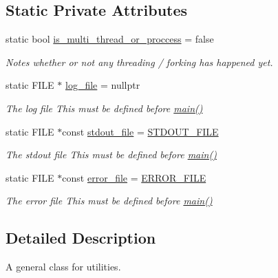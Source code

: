 \subsection*{Static Private Attributes}
\begin{DoxyCompactItemize}
\item 
static bool \hyperlink{class_utilities_af893d8dcd5bb1ba3fc72fc108536bcbc}{is\+\_\+multi\+\_\+thread\+\_\+or\+\_\+proccess} = false
\begin{DoxyCompactList}\small\item\em Notes whether or not any threading / forking has happened yet. \end{DoxyCompactList}\item 
static F\+I\+LE $\ast$ \hyperlink{class_utilities_a63ce9d08b6459cd102bb368a274aca07}{log\+\_\+file} = nullptr
\begin{DoxyCompactList}\small\item\em The log file This must be defined before \hyperlink{shadow__stack_8cpp_a0ddf1224851353fc92bfbff6f499fa97}{main()} \end{DoxyCompactList}\item 
static F\+I\+LE $\ast$const \hyperlink{class_utilities_a224eea0a234ac9877a8334f74fc89ef0}{stdout\+\_\+file} = \hyperlink{constants_8hpp_a195ca3987a60992c5abfc663cd37151d}{S\+T\+D\+O\+U\+T\+\_\+\+F\+I\+LE}
\begin{DoxyCompactList}\small\item\em The stdout file This must be defined before \hyperlink{shadow__stack_8cpp_a0ddf1224851353fc92bfbff6f499fa97}{main()} \end{DoxyCompactList}\item 
static F\+I\+LE $\ast$const \hyperlink{class_utilities_afc3b1cf892b76cede8fa87bfdd17533c}{error\+\_\+file} = \hyperlink{constants_8hpp_a9fdff3d78b754d4b831816d0560dbb57}{E\+R\+R\+O\+R\+\_\+\+F\+I\+LE}
\begin{DoxyCompactList}\small\item\em The error file This must be defined before \hyperlink{shadow__stack_8cpp_a0ddf1224851353fc92bfbff6f499fa97}{main()} \end{DoxyCompactList}\end{DoxyCompactItemize}


\subsection{Detailed Description}
A general class for utilities. 

